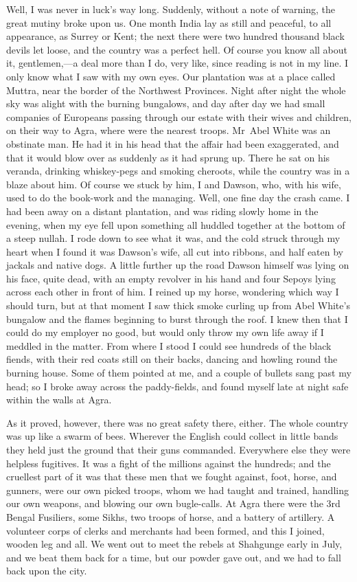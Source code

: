 Well, I was never in luck's way long. Suddenly, without a note of warning, the great mutiny broke upon us. One month India lay as still and peaceful, to all appearance, as Surrey or Kent; the next there were two hundred thousand black devils let loose, and the country was a perfect hell. Of course you know all about it, gentlemen,—a deal more than I do, very like, since reading is not in my line. I only know what I saw with my own eyes. Our plantation was at a place called Muttra, near the border of the Northwest Provinces. Night after night the whole sky was alight with the burning bungalows, and day after day we had small companies of Europeans passing through our estate with their wives and children, on their way to Agra, where were the nearest troops. Mr~Abel White was an obstinate man. He had it in his head that the affair had been exaggerated, and that it would blow over as suddenly as it had sprung up. There he sat on his veranda, drinking whiskey-pegs and smoking cheroots, while the country was in a blaze about him. Of course we stuck by him, I and Dawson, who, with his wife, used to do the book-work and the managing. Well, one fine day the crash came. I had been away on a distant plantation, and was riding slowly home in the evening, when my eye fell upon something all huddled together at the bottom of a steep nullah. I rode down to see what it was, and the cold struck through my heart when I found it was Dawson's wife, all cut into ribbons, and half eaten by jackals and native dogs. A little further up the road Dawson himself was lying on his face, quite dead, with an empty revolver in his hand and four Sepoys lying across each other in front of him. I reined up my horse, wondering which way I should turn, but at that moment I saw thick smoke curling up from Abel White's bungalow and the flames beginning to burst through the roof. I knew then that I could do my employer no good, but would only throw my own life away if I meddled in the matter. From where I stood I could see hundreds of the black fiends, with their red coats still on their backs, dancing and howling round the burning house. Some of them pointed at me, and a couple of bullets sang past my head; so I broke away across the paddy-fields, and found myself late at night safe within the walls at Agra.

As it proved, however, there was no great safety there, either. The whole country was up like a swarm of bees. Wherever the English could collect in little bands they held just the ground that their guns commanded. Everywhere else they were helpless fugitives. It was a fight of the millions against the hundreds; and the cruellest part of it was that these men that we fought against, foot, horse, and gunners, were our own picked troops, whom we had taught and trained, handling our own weapons, and blowing our own bugle-calls. At Agra there were the 3rd Bengal Fusiliers, some Sikhs, two troops of horse, and a battery of artillery. A volunteer corps of clerks and merchants had been formed, and this I joined, wooden leg and all. We went out to meet the rebels at Shahgunge early in July, and we beat them back for a time, but our powder gave out, and we had to fall back upon the city.

